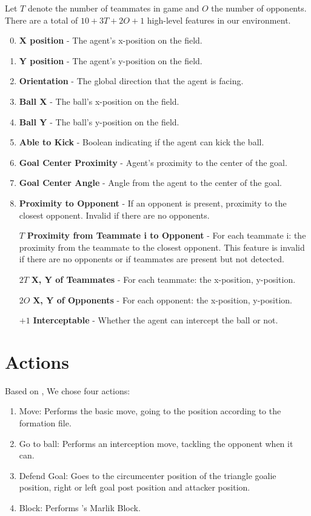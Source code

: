 Let $T$ denote the number of teammates in game and $O$ the
number of opponents. There are a total of $10 + 3T + 2O + 1$ high-level
features in our environment.

\begin{enumerate}[noitemsep]
\setcounter{enumi}{-1}
\item{\textbf{X position} - The agent’s x-position on the field.}
\item{\textbf{Y position} - The agent’s y-position on the field.}
\item{\textbf{Orientation} - The global direction that the agent is facing.}
\item{\textbf{Ball X} - The ball's x-position on the field.}
\item{\textbf{Ball Y} - The ball's y-position on the field.}
\item{\textbf{Able to Kick} - Boolean indicating if the agent can kick the ball.}
\item{\textbf{Goal Center Proximity} - Agent's proximity to the center of the goal.}
\item{\textbf{Goal Center Angle} - Angle from the agent to the center of the goal.}
\item{\textbf{Proximity to Opponent} - If an opponent is present,
  proximity to the closest opponent. Invalid if there are no
  opponents.}
\item [$T$] {\textbf{Proximity from Teammate i to Opponent} - For each
  teammate i: the proximity from the teammate to the closest
  opponent. This feature is invalid if there are no opponents or if
  teammates are present but not detected.}
\item [$2T$] {\textbf{X, Y of Teammates} - For each teammate: the x-position, y-position.}
\item [$2O$] {\textbf{X, Y of Opponents} - For each opponent: the x-position, y-position.}
\item [$+1$] {\textbf{Interceptable} - Whether the agent can intercept the ball or
 not.}
\end{enumerate}

\section{Actions}
Based on \cite{cyrus}, We chose four actions: 
\begin{enumerate}
    \item Move: Performs the basic move, going to the position according to the formation file.
    \item Go to ball: Performs an interception move, tackling the opponent when it can.
    \item Defend Goal: Goes to the circumcenter position of the triangle goalie position, right or left goal post position and attacker position.
    \item Block: Performs \cite{marlik2011}'s Marlik Block.
\end{enumerate}

